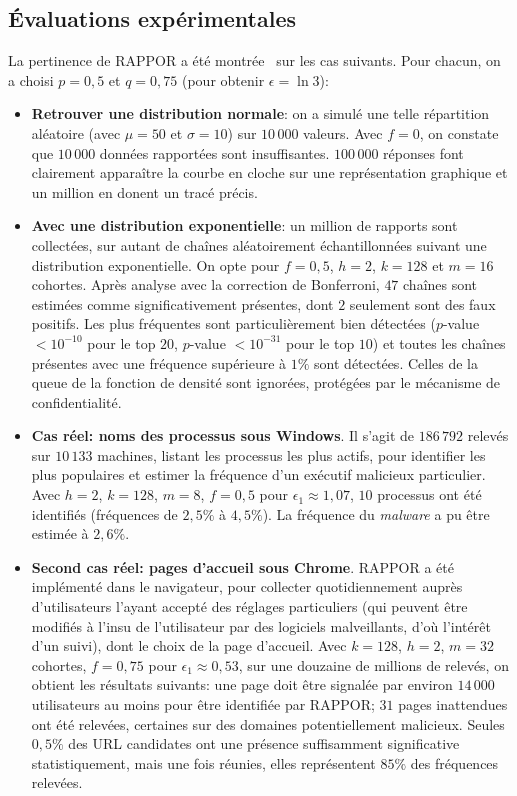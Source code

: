 \documentclass[a4paper,11pt]{article} %
\begin{document}
\subsection{Évaluations expérimentales}
%
La pertinence de RAPPOR a été montrée~\cite{EPK14} sur les cas suivants. Pour chacun, on a choisi $p=0,5$ et $q=0,75$ (pour obtenir $\epsilon=\ln 3$):
\begin{itemize}
    \item 
    \textbf{Retrouver une distribution normale}: on a simulé une telle répartition aléatoire (avec $\mu=50$ et $\sigma=10$) sur $10\,000$ valeurs. Avec $f=0$, on constate que $10\,000$ données rapportées sont insuffisantes. $100\,000$ réponses font clairement apparaître la courbe en cloche sur une représentation graphique et un million en donent un tracé précis.
    \item 
    \textbf{Avec une distribution exponentielle}: un million de rapports sont collectées, sur autant de chaînes aléatoirement échantillonnées suivant une distribution exponentielle. On opte pour $f=0,5$, $h=2$, $k=128$ et $m=16$ cohortes. Après analyse avec la correction de Bonferroni, $47$ chaînes sont estimées comme significativement présentes, dont $2$ seulement sont des faux positifs. Les plus fréquentes sont particulièrement bien détectées ($p$-value $<10^{-10}$ pour le top $20$, $p$-value $<10^{-31}$ pour le top $10$) et toutes les chaînes présentes avec une fréquence supérieure à $1\%$ sont détectées. Celles de la \og queue\fg{} de la fonction de densité sont ignorées, protégées par le mécanisme de confidentialité.
    \item 
    \textbf{Cas réel: noms des processus sous Windows}. Il s'agit de $186\,792$ relevés sur $10\,133$ machines, listant les processus les plus actifs, pour identifier les plus populaires et estimer la fréquence d'un exécutif malicieux particulier. Avec $h=2$, $k=128$, $m=8$, $f=0,5$ pour $\epsilon_1\approx1,07$, $10$ processus ont été identifiés (fréquences de $2,5\%$ à $4,5\%$). La fréquence du \emph{malware} a pu être estimée à $2,6\%$.
    \item 
    \textbf{Second cas réel: pages d'accueil sous Chrome}. RAPPOR a été implémenté dans le navigateur, pour collecter quotidiennement auprès d'utilisateurs l'ayant accepté des réglages particuliers (qui peuvent être modifiés à l'insu de l'utilisateur par des logiciels malveillants, d'où l'intérêt d'un suivi), dont le choix de la page d'accueil. 
    Avec $k=128$, $h=2$, $m=32$ cohortes, $f=0,75$ pour $\epsilon_1\approx0,53$, sur une douzaine de millions de relevés, on obtient les résultats suivants: une page doit être signalée par environ $14\,000$ utilisateurs au moins pour être identifiée par RAPPOR; $31$ pages inattendues ont été relevées, certaines sur des domaines potentiellement malicieux. 
    Seules $0,5\%$ des URL candidates ont une présence suffisamment significative statistiquement, mais une fois réunies, elles représentent $85\%$ des fréquences relevées.
\end{itemize}
\end{document}

